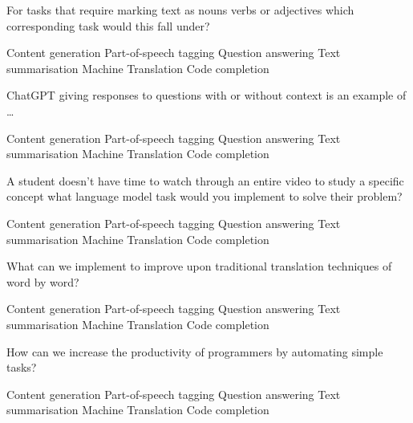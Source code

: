 \documentclass[theme=sleek, randomorder, hidesidemenu]{webquiz}
\begin{document}
\begin{question}
  For tasks that require marking text as nouns verbs or adjectives which corresponding task would this fall under?
  \begin{choice}
    \incorrect Content generation
    \correct Part-of-speech tagging
    \incorrect Question answering
    \incorrect Text summarisation
    \incorrect Machine Translation
    \incorrect Code completion
  \end{choice}
\end{question}

\begin{question}
  ChatGPT giving responses to questions with or without context is an example of \ldots
  \begin{choice}
    \incorrect Content generation
    \incorrect Part-of-speech tagging
    \correct Question answering
    \incorrect Text summarisation
    \incorrect Machine Translation
    \incorrect Code completion
  \end{choice}
\end{question}

\begin{question}
  A student doesn't have time to watch through an entire video to study a specific concept what language model task would you implement to solve their problem?
  \begin{choice}
    \incorrect Content generation
    \incorrect Part-of-speech tagging
    \incorrect Question answering
    \correct Text summarisation
    \incorrect Machine Translation
    \incorrect Code completion
  \end{choice}
\end{question}

\begin{question}
  What can we implement to improve upon traditional translation techniques of word by word?
  \begin{choice}
    \incorrect Content generation
    \incorrect Part-of-speech tagging
    \incorrect Question answering
    \incorrect Text summarisation
    \correct Machine Translation
    \incorrect Code completion
  \end{choice}
\end{question}

\begin{question}
  How can we increase the productivity of programmers by automating simple tasks?
  \begin{choice}
    \incorrect Content generation
    \incorrect Part-of-speech tagging
    \incorrect Question answering
    \incorrect Text summarisation
    \incorrect Machine Translation
    \correct Code completion
  \end{choice}
\end{question}
\end{document}
